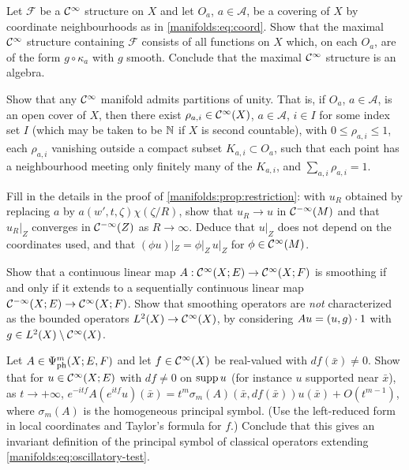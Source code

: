 \begin{exercise}\label{manifolds:ex:maximal}
Let $\mathcal F$ be a $\mathcal{C}^\infty$ structure on $X$ and let $O_a$, $a\in\mathcal A$, be a covering of
$X$ by coordinate neighbourhoods as in \eqref{manifolds:eq:coord}. Show that the maximal
$\mathcal{C}^\infty$ structure containing $\mathcal F$ consists of all functions on $X$ which, on each
$O_a$, are of the form $g\circ\kappa_a$ with $g$ smooth. Conclude that the maximal $\mathcal{C}^\infty$
structure is an algebra.
\end{exercise}

\begin{exercise}\label{manifolds:ex:partition}
Show that any $\mathcal{C}^\infty$ manifold admits partitions of unity. That is, if $O_a$, $a\in\mathcal A$,
is an open cover of $X$, then there exist $\rho_{a,i}\in\mathcal{C}^\infty(X)$, $a\in\mathcal A$, $i\in I$
for some index set $I$ (which may be taken to be $\mathbb{N}$ if $X$ is second countable), with
$0\le\rho_{a,i}\le1$, each $\rho_{a,i}$ vanishing outside a compact subset $K_{a,i}\subset O_a$,
such that each point has a neighbourhood meeting only finitely many of the $K_{a,i}$,
and $\sum_{a,i}\rho_{a,i}=1$.
\end{exercise}

\begin{exercise}\label{manifolds:ex:restriction}
Fill in the details in the proof of \cref{manifolds:prop:restriction}: with $u_R$
obtained by replacing $a$ by $a(w',t,\zeta)\chi(\zeta/R)$, show that $u_R\to u$ in $\mathcal{C}^{-\infty}(M)$ and
that $u_R|_Z$ converges in $\mathcal{C}^{-\infty}(Z)$ as $R\to\infty$. Deduce that $u|_Z$ does not depend on
the coordinates used, and that $(\phi u)|_Z=\phi|_Z\,u|_Z$ for $\phi\in\mathcal{C}^\infty(M)$.
\end{exercise}

\begin{exercise}\label{manifolds:ex:smoothing-char}
Show that a continuous linear map $A:\mathcal{C}^\infty(X;E)\to\mathcal{C}^\infty(X;F)$ is smoothing if and only if
it extends to a sequentially continuous linear map $\mathcal{C}^{-\infty}(X;E)\to\mathcal{C}^\infty(X;F)$. Show that smoothing operators are \emph{not}
characterized as the bounded operators $L^2(X)\to\mathcal{C}^\infty(X)$, by considering
$Au=( u, g)\cdot1$ with $g\in L^2(X)\setminus\mathcal{C}^\infty(X)$.
\end{exercise}

\begin{exercise}\label{manifolds:ex:oscillatory}
Let $A\in\Psi^{m}_{\mathrm{ph}}(X;E,F)$ and let $f\in\mathcal{C}^\infty(X)$ be real-valued with
$df(\bar x)\ne0$. Show that for $u\in\mathcal{C}^\infty(X;E)$ with $df\ne0$ on $\operatorname{supp} u$ (for instance $u$
supported near $\bar x$), as $t\to+\infty$,
$e^{-itf}A(e^{itf}u)(\bar x)=t^m\sigma_m(A)(\bar x,df(\bar x))u(\bar x)+O(t^{m-1})$, where
$\sigma_m(A)$ is the homogeneous principal symbol. (Use the left-reduced form in local
coordinates and Taylor's formula for $f$.) Conclude that this gives an invariant
definition of the principal symbol of classical operators extending
\eqref{manifolds:eq:oscillatory-test}.
\end{exercise}


